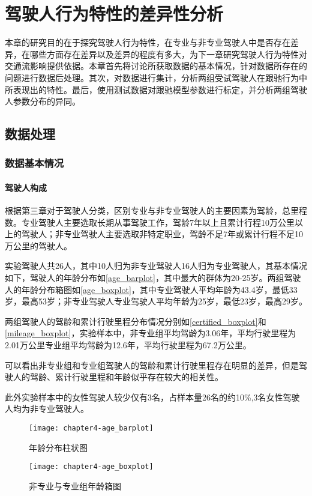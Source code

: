 \chapter{驾驶人行为特性的差异性分析}
本章的研究目的在于探究驾驶人行为特性，在专业与非专业驾驶人中是否存在差异，在哪些方面存在差异以及差异的程度有多大，为下一章研究驾驶人行为特性对交通流影响提供依据。本章首先将讨论所获取数据的基本情况，针对数据所存在的问题进行数据后处理。其次，对数据进行集计，分析两组受试驾驶人在跟驰行为中所表现出的特性。最后，使用测试数据对跟驰模型参数进行标定，并分析两组驾驶人参数分布的异同。
\section{数据处理}
\subsection{数据基本情况}
\subsubsection{驾驶人构成}

根据第三章对于驾驶人分类，区别专业与非专业驾驶人的主要因素为驾龄，总里程数。专业驾驶人主要选取长期从事驾驶工作，驾龄7年以上且累计行程10万公里以上的驾驶人；非专业驾驶人主要选取非特定职业，驾龄不足7年或累计行程不足10万公里的驾驶人。

实验驾驶人共26人，其中10人归为非专业驾驶人16人归为专业驾驶人，其基本情况如下，驾驶人的年龄分布如\autoref{age_barplot}，其中最大的群体为20-25岁。两组驾驶人的年龄分布箱图如\autoref{age_boxplot}，其中专业驾驶人平均年龄为43.4岁，最低33岁，最高53岁；非专业驾驶人专业驾驶人平均年龄为25岁，最低23岁，最高29岁。

两组驾驶人的驾龄和累计行驶里程分布情况分别如\autoref{certified_boxplot}和\autoref{mileage_boxplot}，实验样本中，非专业组平均驾龄为3.06年，平均行驶里程为2.01万公里专业组平均驾龄为12.6年，平均行驶里程为67.2万公里。

可以看出非专业组和专业组驾驶人的驾龄和累计行驶里程存在明显的差异，但是驾驶人的驾龄、累计行驶里程和年龄似乎存在较大的相关性。

此外实验样本中的女性驾驶人较少仅有3名，占样本量26名的约10\%,3名女性驾驶人均为非专业驾驶人。



\begin{figure}
\begin{minipage}[t]{0.48\linewidth}
\centering
\texttt{[image: chapter4-age\_barplot]}
\caption{年龄分布柱状图}
\label{age_barplot}
\end{minipage}%
\hspace*{0.04\linewidth}
\begin{minipage}[t]{0.48\linewidth}
\centering
\texttt{[image: chapter4-age\_boxplot]}
\caption{非专业与专业组年龄箱图}
\label{age_boxplot}
\end{minipage}
\end{figure}

